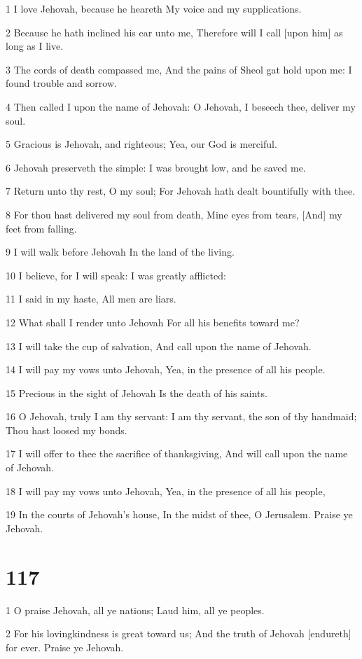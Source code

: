 \par 1 I love Jehovah, because he heareth My voice and my supplications.
\par 2 Because he hath inclined his ear unto me, Therefore will I call [upon him] as long as I live.
\par 3 The cords of death compassed me, And the pains of Sheol gat hold upon me: I found trouble and sorrow.
\par 4 Then called I upon the name of Jehovah: O Jehovah, I beseech thee, deliver my soul.
\par 5 Gracious is Jehovah, and righteous; Yea, our God is merciful.
\par 6 Jehovah preserveth the simple: I was brought low, and he saved me.
\par 7 Return unto thy rest, O my soul; For Jehovah hath dealt bountifully with thee.
\par 8 For thou hast delivered my soul from death, Mine eyes from tears, [And] my feet from falling.
\par 9 I will walk before Jehovah In the land of the living.
\par 10 I believe, for I will speak: I was greatly afflicted:
\par 11 I said in my haste, All men are liars.
\par 12 What shall I render unto Jehovah For all his benefits toward me?
\par 13 I will take the cup of salvation, And call upon the name of Jehovah.
\par 14 I will pay my vows unto Jehovah, Yea, in the presence of all his people.
\par 15 Precious in the sight of Jehovah Is the death of his saints.
\par 16 O Jehovah, truly I am thy servant: I am thy servant, the son of thy handmaid; Thou hast loosed my bonds.
\par 17 I will offer to thee the sacrifice of thanksgiving, And will call upon the name of Jehovah.
\par 18 I will pay my vows unto Jehovah, Yea, in the presence of all his people,
\par 19 In the courts of Jehovah's house, In the midst of thee, O Jerusalem. Praise ye Jehovah.

\chapter{117}

\par 1 O praise Jehovah, all ye nations; Laud him, all ye peoples.
\par 2 For his lovingkindness is great toward us; And the truth of Jehovah [endureth] for ever. Praise ye Jehovah.

